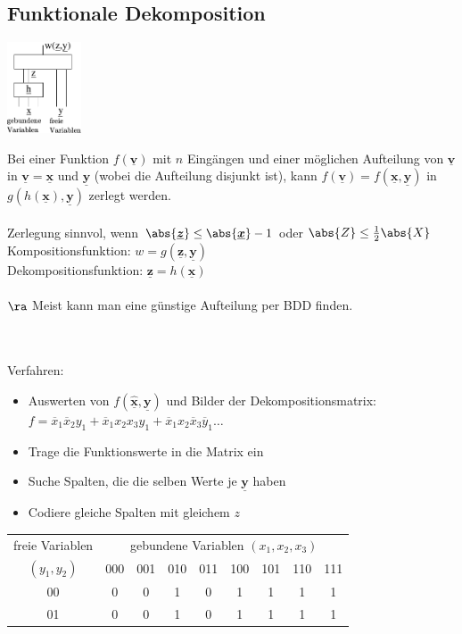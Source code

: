 \documentclass[6pt,a4paper]{scrartcl}
\renewcommand{\vec}[1]{\ensuremath{\underline{\boldsymbol {#1}}}}
\renewcommand{\vec}[1]{\ensuremath{\underline{\boldsymbol {#1}}}}
\begin{document}
\begin{multicols}{3}
\section{Funktionale Dekomposition} %
\label{sub:Funktionale Dekomposition}
\parbox{2.7cm}{ \includegraphics[width = 2.2cm]{./img/ds/decomp.pdf} }
\parbox{6.0cm}{
Bei einer Funktion $f(\vec v)$ mit $n$ Eingängen und einer möglichen Aufteilung von $\vec v$ in $\vec v = \vec x$ und $\vec y$ (wobei die Aufteilung disjunkt ist), kann $f(\vec v) = f(\vec x, \vec y)$ in $g(h(\vec x), \vec y)$ zerlegt werden. \\
\\
Zerlegung sinnvol, wenn $\abs{\vec z} \le \abs{\vec x} -1$ oder $\abs{Z} \le \frac{1}{2} \abs{X}$ \\
Kompositionsfunktion: $w = g(\vec z, \vec y)$ \\
Dekompositionsfunktion: $\vec z = h(\vec x)$ \\
\\
$\ra $ Meist kann man eine günstige Aufteilung per BDD finden. }\\
\\
Verfahren:
\begin{itemize}
	\item Auswerten von $f(\vec{\hat x}, \vec y)$ und Bilder der Dekompositionsmatrix: \\
		$f = \overline x_1\overline x_2 y_1 + \overline x_1  x_2  x_3  y_1 + \overline x_1  x_2 \overline x_3  \overline y_1 \ldots$
	\item Trage die Funktionswerte in die Matrix ein
	\item Suche Spalten, die die selben Werte je $\vec y$ haben
	\item Codiere gleiche Spalten mit gleichem $z$
\end{itemize}
		\begin{tabular}{c | c | c | c | c | c | c | c | c }
			freie Variablen & \multicolumn{8}{c}{gebundene Variablen $(x_1, x_2, x_3)$}  \\
			 $(y_1, y_2)$ & 000 &  001 & 010 & 011 & 100 & 101 & 110 & 111  \\ \midrule
			00	& 0 & 0 & 1 & 0 & 1 & 1 & 1 & 1 \\
			01 & 0 & 0 & 1 & 0 & 1 & 1 & 1 & 1 \\

\end{tabular}
\end{multicols}
\end{document}
